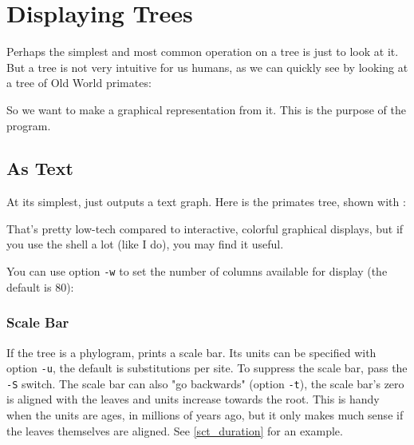 
\section{Displaying Trees}
\label{sct_display}

Perhaps the simplest and most common operation on a \nw{} tree is just to look
at it. But a \nw{} tree is not very intuitive for us humans, as we can quickly
see by looking \eg{} at a tree of Old World primates:


\begin{samepage}

\end{samepage}

\noindent{}So we want to make a graphical representation from it. This is the purpose of
the \display{} program. 

\subsection{As Text}
\label{sct_display_text}

At its simplest, \display{} just outputs a text graph. Here is the primates tree, shown with \display{}:

\begin{samepage}

\end{samepage}
That's pretty low-tech compared to interactive, colorful graphical displays,
but if you use the shell a lot (like I do), you may find it useful.

You can use option \texttt{-w} to set the number of columns
available for display (the default is 80):


\begin{samepage}

\end{samepage}

\subsubsection{Scale Bar}

If the tree is a phylogram, \display{} prints a scale bar. Its units can be
specified with option \texttt{-u}, the default is substitutions per site. To
suppress the scale bar, pass the \texttt{-S} switch. The scale bar can also "go
backwards" (option \texttt{-t}), \ie{} the scale bar's zero is aligned with the
leaves and units increase towards the root. This is handy when the units are
ages, \eg{} in millions of years ago, but it only makes much sense if the leaves
themselves are aligned. See \ref{sct_duration} for an example.

